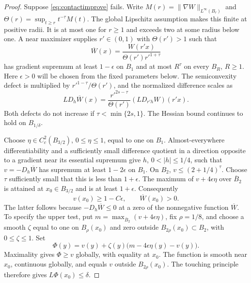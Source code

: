 \documentclass[11pt]{article}
\numberwithin{equation}{section}
\theoremstyle{remark}
\newcommand{\norm}[1]{\lVert #1\rVert}
\newcommand{\abs}[1]{\lvert #1\rvert}
\begin{document}
\begin{proof}
Suppose \eqref{eq:contactimprove} fails. Write $M(r)=\norm{\nabla W}_{L^\infty(B_r)}$ and $\Theta(r)=\sup_{t\ge r}t^{-\tau}M(t)$. The global Lipschitz assumption makes this finite at positive radii. It is at most one for $r\ge1$ and exceeds two at some radius below one. A near maximizer supplies $r'\in(0,1)$ with $\Theta(r')>1$ such that
\[
 \overline W(x)=\frac{W(r'x)}{\Theta(r')r'^{1+\tau}}
\]
has gradient supremum at least $1-\epsilon$ on $B_1$ and at most $R^\tau$ on every $B_R$, $R\ge1$. Here $\epsilon>0$ will be chosen from the fixed parameters below. The semiconvexity defect is multiplied by $r'^{1-\tau}/\Theta(r')$, and the normalized difference scales as
\begin{equation}\label{eq:differencescaling}
 LD_h\overline W(x)
 =\frac{r'^{2s-\tau}}{\Theta(r')}(LD_{r'h}W)(r'x).
\end{equation}
Both defects do not increase if $\tau<\min\{2s,1\}$. The Hessian bound continues to hold on $B_{1/\delta}$.

Choose $\eta\in C_c^2(B_{3/2})$, $0\le\eta\le1$, equal to one on $B_1$. Almost-everywhere differentiability and a sufficiently small difference quotient in a direction opposite to a gradient near its essential supremum give $h$, $0<\abs h\le1/4$, such that $v=-D_h\overline W$ has supremum at least $1-2\epsilon$ on $B_1$. On $B_2$, $v\le(2+1/4)^\tau$. Choose $\tau$ sufficiently small that this is less than $1+\epsilon$. The maximum of $v+4\epsilon\eta$ over $\overline B_2$ is attained at $x_0\in B_{3/2}$ and is at least $1+\epsilon$. Consequently
\[
 v(x_0)\ge1-C\epsilon,
 \qquad \overline W(x_0)>0.
\]
The latter follows because $-D_h\overline W\le0$ at a zero of the nonnegative function $\overline W$. To specify the upper test, put $m=\max_{\overline B_2}(v+4\epsilon\eta)$, fix $\rho=1/8$, and choose a smooth $\zeta$ equal to one on $B_\rho(x_0)$ and zero outside $B_{2\rho}(x_0)\subset B_2$, with $0\le\zeta\le1$. Set
\[
 \Phi(y)=v(y)+\zeta(y)\bigl(m-4\epsilon\eta(y)-v(y)\bigr).
\]
Maximality gives $\Phi\ge v$ globally, with equality at $x_0$. The function is smooth near $x_0$, continuous globally, and equals $v$ outside $B_{2\rho}(x_0)$. The touching principle therefore gives $L\Phi(x_0)\le\delta$.


\end{proof}
\end{document}
